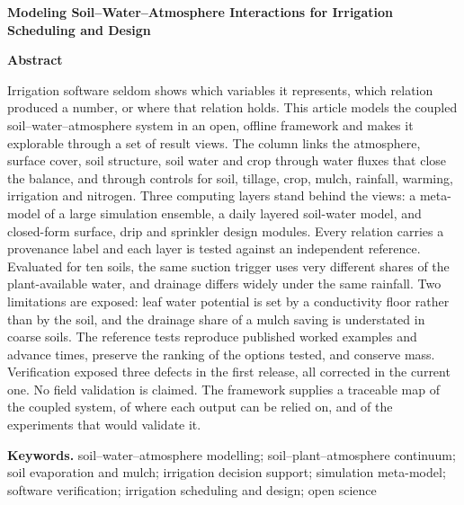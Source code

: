 
\usepackage{longtable,array}

\linenumbers
\begin{titlepage}
\vspace*{-1.2cm}
\begin{center}{\Large\bfseries Modeling Soil--Water--Atmosphere Interactions for Irrigation Scheduling and Design\par}\end{center}
\vspace{0.4cm}
\authorblock
\vspace{0.4cm}

{\small\setlength{\parindent}{0pt}\setlength{\parskip}{0pt}
\begin{center}\textbf{\normalsize Abstract}\end{center}\vspace{-0.4em}
\noindent Irrigation software seldom shows which variables it represents, which relation produced a number, or where that relation holds. This article models the coupled soil--water--atmosphere system in an open, offline framework and makes it explorable through a set of result views. The column links the atmosphere, surface cover, soil structure, soil water and crop through water fluxes that close the balance, and through controls for soil, tillage, crop, mulch, rainfall, warming, irrigation and nitrogen. Three computing layers stand behind the views: a meta-model of a large simulation ensemble, a daily layered soil-water model, and closed-form surface, drip and sprinkler design modules. Every relation carries a provenance label and each layer is tested against an independent reference. Evaluated for ten soils, the same suction trigger uses very different shares of the plant-available water, and drainage differs widely under the same rainfall. Two limitations are exposed: leaf water potential is set by a conductivity floor rather than by the soil, and the drainage share of a mulch saving is understated in coarse soils. The reference tests reproduce published worked examples and advance times, preserve the ranking of the options tested, and conserve mass. Verification exposed three defects in the first release, all corrected in the current one. No field validation is claimed. The framework supplies a traceable map of the coupled system, of where each output can be relied on, and of the experiments that would validate it.

\medskip\noindent \textbf{Keywords.} soil--water--atmosphere modelling; soil--plant--atmosphere continuum; soil evaporation and mulch; irrigation decision support; simulation meta-model; software verification; irrigation scheduling and design; open science\par}
\end{titlepage}

